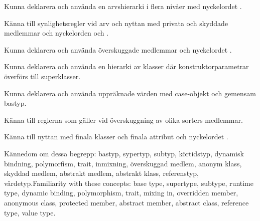 

\item Kunna deklarera och använda en arvshierarki i flera nivåer med nyckelordet .

\item Känna till synlighetsregler vid arv och nyttan med privata och skyddade medlemmar och nyckelorden  och .


\item Kunna deklarera och använda överskuggade medlemmar och nyckelordet .

\item Kunna deklarera och använda en hierarki av klasser där konstruktorparametrar överförs till superklasser.

\item Kunna deklarera och använda uppräknade värden med case-objekt och gemensam bastyp.

\item Känna till reglerna som gäller vid överskuggning av olika sorters medlemmar.

\item Känna till nyttan med finala klasser och finala attribut och nyckelordet .

\item \ifswedish Kännedom om dessa begrepp:
bastyp,
sypertyp,
subtyp,
körtidstyp,
dynamisk bindning,
polymorfism,
trait,
inmixning,
överskuggad medlem,
anonym klass,
skyddad medlem,
abstrakt medlem,
abstrakt klass,
referenstyp,
värdetyp.\else Familiarity with these concepts:
base type,
supertype,
subtype,
runtime type,
dynamic binding,
polymorphism,
trait,
mixing in,
overridden member,
anonymous class,
protected member,
abstract member,
abstract class,
reference type,
value type.\fi







